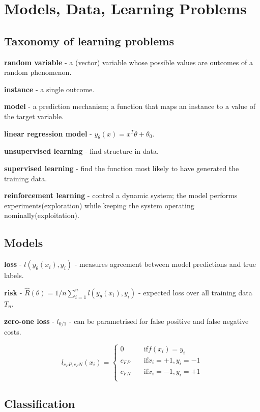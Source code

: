 \documentclass{article}
\newcommand{\para}[0]{\par\vspace{0.2cm}\noindent}
\newcommand{\define}[2]{\textbf{#1} - {#2}.  \para}
\begin{document}
\section{Models, Data, Learning Problems}
\subsection{Taxonomy of learning problems}
\define{random variable}
           {a (vector) variable whose possible values are outcomes of a random phenomenon}
\define{instance}
           {a single outcome}
\define{model}
           {a prediction mechanism; a function that maps an instance to a value of the target variable}
\define{linear regression model}
           {$y_\theta(x) = x^T \theta + \theta_0$}
\define{unsupervised learning}
           {find structure in data}
\define{supervised learning}
           {find the function most likely to have generated the training data}
\define{reinforcement learning}
           {control a dynamic system; the model performs experiments(exploration) while keeping the system operating nominally(exploitation)}


\subsection{Models}
\define{loss}
           {$l(y_\theta(x_i), y_i)$ - measures agreement between model predictions and true labels}
\define{risk}
           {$\hat R(\theta) = 1/n \sum_{i=1}^n l(y_\theta(x_i), y_i)$ - expected loss over all training data $T_n$}
\define{zero-one loss}
           {$l_{0/1}$ - can be parametrised for false positive and false negative costs}
$$l_{c_FP, c_FN}(x_i) =
  \begin{cases}
    0         & \quad \mathrm{if } f(x_i) = y_i  \\
    c_{FP}    & \quad \mathrm{if } x_i = +1, y_i = -1  \\
    c_{FN}    & \quad \mathrm{if } x_i = -1, y_i = +1  \\
  \end{cases}$$


\subsection{Classification}



\end{document}
